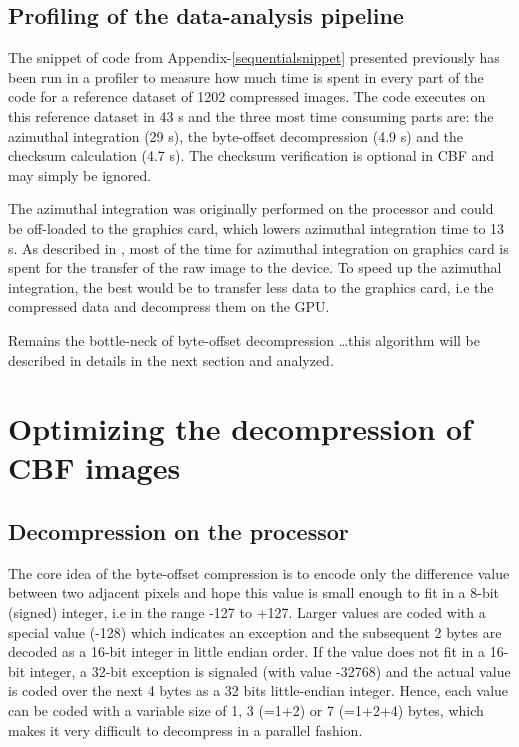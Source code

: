 \documentclass[preprint]{iucr}              %
\begin{document}
\subsection{Profiling of the data-analysis pipeline}

The snippet of code from Appendix-\ref{sequentialsnippet} presented previously has been run in a profiler to
measure how much time is spent in every part of the code for a reference
dataset of 1202 compressed images.
The code executes on this reference dataset in 43 s and the
three most time consuming parts are: the azimuthal integration (29 s), the
byte-offset decompression (4.9 s) and the checksum calculation (4.7 s).
The checksum verification is optional in CBF and may simply be ignored.

The azimuthal integration was originally performed on the processor and could be
off-loaded to the graphics card, which lowers azimuthal integration time to 13 s.
As described in \cite{kieffer_ashiotis-proc-euroscipy-2014}, most of the time
for azimuthal integration on graphics card is spent for the transfer of the raw image to the device.
To speed up the azimuthal integration, the best would be to transfer less data
to the graphics card, i.e the compressed data and decompress them on the GPU.

Remains the bottle-neck of byte-offset decompression \ldots this algorithm will
be described in details in the next section and analyzed. 

\section{Optimizing the decompression of CBF images}

\subsection{Decompression on the processor}

The core idea of the byte-offset compression is to encode only the difference
value between two adjacent pixels and hope this value is small enough to fit in
a 8-bit (signed) integer, i.e in the range -127 to +127.
Larger values are coded with a special value (-128) which indicates an exception
and the subsequent 2 bytes are decoded as a 16-bit integer in little endian
order.
If the value does not fit in a 16-bit integer, a 32-bit exception is
signaled (with value -32768) and the actual value is coded over the next 4 bytes
as a 32 bits little-endian integer.
Hence, each value can be coded with a variable size of 1, 3 (=1+2) or 7 (=1+2+4)
bytes, which makes it very difficult to decompress in a parallel fashion.
\end{document}
